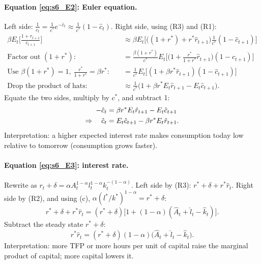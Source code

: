 \paragraph{Equation \eqref{eq:s6_E2}: Euler equation.} Left side: $\frac1{c_t}=\frac{1}{c^*}e^{-\hat c_t}\approx\frac1{c^*}(1-\hat c_t)$. Right side, using (R3) and (R1):
\begin{align*}
\beta E_t\Big[\frac{1+r_{t+1}}{c_{t+1}}\Big]
&\approx\beta E_t\Big[\big((1+r^*)+r^*\hat r_{t+1}\big)\frac{1}{c^*}(1-\hat c_{t+1})\Big]\\
\text{Factor out }(1+r^*):\quad&=\frac{\beta(1+r^*)}{c^*}E_t\Big[\Big(1+\frac{r^*}{1+r^*}\hat r_{t+1}\Big)(1-\hat c_{t+1})\Big]\\
\text{Use }\beta(1+r^*)=1,\ \tfrac{r^*}{1+r^*}=\beta r^*:\quad&=\frac1{c^*}E_t\big[(1+\beta r^*\hat r_{t+1})(1-\hat c_{t+1})\big]\\
\text{Drop the product of hats:}\quad&\approx\frac1{c^*}\big(1+\beta r^*E_t\hat r_{t+1}-E_t\hat c_{t+1}\big).
\end{align*}
Equate the two sides, multiply by $c^*$, and subtract 1:
\begin{align}
-\hat c_t&=\beta r^*E_t\hat r_{t+1}-E_t\hat c_{t+1}\notag\\
\Rightarrow\quad \hat c_t&=E_t\hat c_{t+1}-\beta r^*E_t\hat r_{t+1}. \label{eq:s6_L2}
\end{align}
Interpretation: a higher expected interest rate makes consumption today low relative to tomorrow (consumption grows faster).

\paragraph{Equation \eqref{eq:s6_E3}: interest rate.} Rewrite as $r_t+\delta=\alpha A_t^{1-\alpha}l_t^{1-\alpha}k_t^{-(1-\alpha)}$. Left side by (R3): $r^*+\delta+r^*\hat r_t$. Right side by (R2), and using (c), $\alpha(l^*/k^*)^{1-\alpha}=r^*+\delta$:
\[
r^*+\delta+r^*\hat r_t=(r^*+\delta)\big[1+(1-\alpha)(\hat A_t+\hat l_t-\hat k_t)\big].
\]
Subtract the steady state $r^*+\delta$:
\begin{equation}\label{eq:s6_L3}
r^*\hat r_t=(r^*+\delta)(1-\alpha)\big(\hat A_t+\hat l_t-\hat k_t\big).
\end{equation}
Interpretation: more TFP or more hours per unit of capital raise the marginal product of capital; more capital lowers it.

